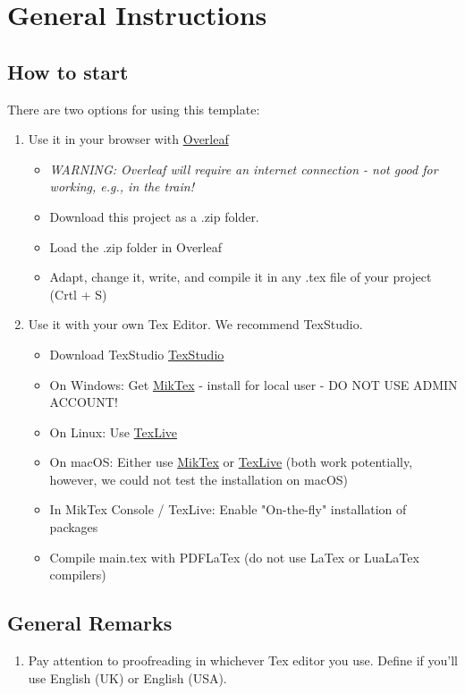 \documentclass[12pt,oneside]{article}
\begin{document}
	\section{General Instructions} 
	\subsection{How to start} 
	There are two options for using this template:
	\begin{enumerate}
		\item Use it in your browser with \href{https://www.overleaf.com/}{Overleaf}
			\begin{itemize}
				\item[] \textit{WARNING: Overleaf will require an internet connection - not good for working, e.g., in the train!}
				\item Download this project as a .zip folder.
				\item Load the .zip folder in Overleaf
				\item Adapt, change it, write, and compile it in any .tex file of your project (Crtl + S)
			\end{itemize}
		\item Use it with your own Tex Editor. We recommend TexStudio.
			\begin{itemize}
				\item Download TexStudio \href{https://www.texstudio.org/}{TexStudio}
				\item On Windows: Get \href{https://miktex.org/howto/install-miktex}{MikTex} - install for local user - DO NOT USE ADMIN ACCOUNT!
				\item On Linux: Use \href{https://en.wikipedia.org/wiki/TeX_Live}{TexLive}
				\item On macOS: Either use \href{https://miktex.org/howto/install-miktex}{MikTex} or \href{https://en.wikipedia.org/wiki/TeX_Live}{TexLive} (both work potentially, however, we could not test the installation on macOS)
				\item In MikTex Console / TexLive: Enable "On-the-fly" installation of packages
				\item Compile main.tex with PDFLaTex (do not use LaTex or LuaLaTex compilers)
			\end{itemize} 
	\end{enumerate}

	\subsection{General Remarks}
	\begin{enumerate}
		\item Pay attention to proofreading in whichever Tex editor you use. Define if you'll use English (UK) or English (USA).

	\end{enumerate}
\end{document}
